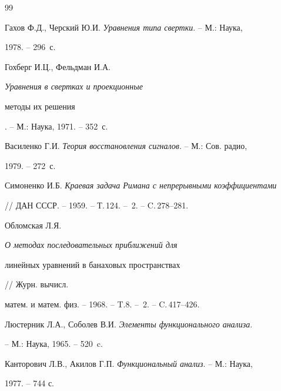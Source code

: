 \begin{thebibliography}{99} 


 




Гахов Ф.Д., Черский Ю.И. {\em Уравнения типа свертки}. -- М.: Наука,


1978. -- 296~с.







Гохберг И.Ц., Фельдман И.А. {\em Уравнения в свертках и проекционные


методы их решения}. -- М.: Наука, 1971. -- 352~с.







Василенко Г.И. {\em Теория восстановления сигналов}. -- М.: Сов. радио,


1979. -- 272~с.







Симоненко И.Б. {\em Краевая задача Римана с непрерывными коэффициентами}


// ДАН СССР. -- 1959. -- Т.\,124. -- \No\,2. -- C.\,278--281.







Обломская Л.Я. {\em О методах последовательных приближений для


линейных уравнений в банаховых пространствах} // Журн. вычисл.


матем. и матем. физ. -- 1968. -- T.8. -- \No\,2. -- C.\,417--426.







Люстерник Л.А., Соболев В.И. {\em Элементы функционального анализа}.


-- М.: Наука, 1965. -- 520~c.







Канторович Л.В., Акилов Г.П. {\em Функциональный анализ}. -- М.: Наука,


1977. -- 744 с.






\end{thebibliography}
